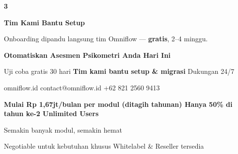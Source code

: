 \documentclass[a4paper]{article}
\begin{document}
\begin{center}
\begin{minipage}[t]{0.318\textwidth}
{\begin{minipage}[t][4.7cm][c]{\dimexpr\linewidth-2\fboxsep\relax}
            \begin{center}{\fontsize{22}{26}\selectfont\bfseries\color{BluePrimary} 3}\end{center}
            \vspace{2pt}
            \begin{center}
                {\fontsize{10}{13}\selectfont\bfseries\color{BlueDark} Tim Kami Bantu Setup}\par\vspace{3pt}
                {\fontsize{9}{12}\selectfont\color{TextDark} Onboarding dipandu langsung tim Omniflow --- \textbf{gratis}, 2--4 minggu.}
            \end{center}
        \end{minipage}}
\end{minipage}
\end{center}

\vspace{8pt}

{\setlength{\fboxsep}{10pt}\setlength{\fboxrule}{0pt}%
\noindent\colorbox{BluePrimary}{%
    \begin{minipage}{\dimexpr\textwidth-2\fboxsep\relax}
        \centering
        {\fontsize{13}{16}\selectfont\bfseries\color{White} Otomatiskan Asesmen Psikometri Anda Hari Ini}\par\vspace{3pt}
        {\fontsize{9.5}{12}\selectfont\color{BlueMid} Uji coba gratis 30 hari \enspace\textbullet\enspace \textbf{Tim kami bantu setup \& migrasi} \enspace\textbullet\enspace Dukungan 24/7}\par\vspace{2pt}
        {\fontsize{9.5}{12}\selectfont\color{BlueLight} omniflow.id \enspace\textbullet\enspace contact@omniflow.id \enspace\textbullet\enspace +62 821 2560 9413}
    \end{minipage}}}


\vspace{6pt}

{\setlength{\fboxsep}{8pt}\setlength{\fboxrule}{0pt}%
\noindent\colorbox{BlueBg}{%
    \begin{minipage}{\dimexpr\textwidth-2\fboxsep\relax}
        \centering
        {\fontsize{9}{12}\selectfont\bfseries\color{BluePrimary}
        Mulai Rp 1,67jt/bulan per modul (ditagih tahunan) \enspace\textbullet\enspace Hanya 50\% di tahun ke-2 \enspace\textbullet\enspace Unlimited Users}\par\vspace{1pt}
        {\fontsize{8.5}{11}\selectfont\color{BlueDark}
        Semakin banyak modul, semakin hemat}\par\vspace{1pt}
        {\fontsize{8}{10}\selectfont\color{TextLight}
        Negotiable untuk kebutuhan khusus \enspace\textbullet\enspace Whitelabel \& Reseller tersedia}
    \end{minipage}}}

\restoregeometry
\pagestyle{empty}
\end{document}
